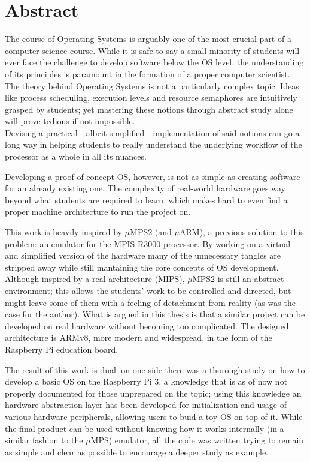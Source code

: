\documentclass[12pt,a4paper,openright,twoside]{report}
\begin{document}
\chapter*{Abstract}                 %
The course of Operating Systems is arguably one of the most crucial part of 
a computer science course. While it is safe to say a small minority of students
will ever face the challenge to develop software below the OS level, the 
understanding of its principles is paramount in the formation of a proper computer
scientist.
The theory behind Operating Systems is not a particularly complex topic. Ideas 
like process scheduling, execution levels and resource semaphores are intuitively
grasped by students; yet mastering these notions through abstract study alone
will prove tedious if not impossible.\\
Devising a practical - albeit simplified - implementation of said notions can
go a long way in helping students to really understand the underlying workflow
of the processor as a whole in all its nuances. 

Developing a proof-of-concept OS, however, is not as simple as creating software for
an already existing one. The complexity of real-world hardware
 goes way beyond what students are required to learn, which makes hard to
 even find a proper machine architecture to run the project on.

This work is heavily inspired by $\mu$MPS2 (and $\mu$ARM), a previous solution to this problem:
 an emulator for the MPIS R3000 processor. By working on a virtual and simplified
 version of the hardware many of the unnecessary tangles are stripped away while
 still mantaining the core concepts of OS development.
Although inspired by a real architecture (MIPS), $\mu$MPS2 is still an abstract 
environment; this allows the students' work to be controlled and directed,
 but might leave some of them with a feeling of detachment from reality
 (as was the case for the author).
What is argued in this thesis is that a similar project can be developed
on real hardware without becoming too complicated. The designed architecture
is ARMv8, more modern and widespread, in the form of the Raspberry Pi education
board.

The result of this work is dual: on one side there was a thorough study on
how to develop a basic OS on the Raspberry Pi 3, a knowledge that is
as of now not properly documented for those unprepared on the topic; using
this knowledge an hardware abstraction layer has been developed for 
initialization and usage of various hardware peripherals, allowing users
to buid a toy OS on top of it.
While the final product can be used without knowing how it works internally 
(in a similar fashion to the $\mu$MPS) emulator, all the code was written 
trying to remain as simple and clear as possible to encourage a deeper study
as example.
\end{document}

